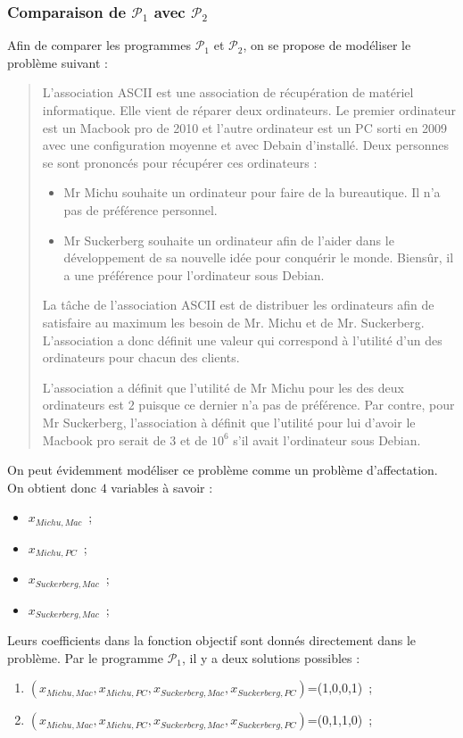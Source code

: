 \documentclass[a4paper, titlepage, oneside, 12pt]{article}%
\begin{document}
\subsubsection{Comparaison de $\mathcal{P}_1$ avec $\mathcal{P}_2$}

Afin de comparer les programmes $\mathcal{P}_1$ et $\mathcal{P}_2$, on se propose de modéliser le problème suivant :
\begin{quote}
L'association ASCII est une association de récupération de matériel informatique. Elle vient de réparer deux ordinateurs. Le premier ordinateur est un Macbook pro de 2010 et l'autre ordinateur est un PC sorti en 2009 avec une configuration moyenne et avec Debain d'installé. Deux personnes se sont prononcés pour récupérer ces ordinateurs :
\begin{itemize}
\item Mr Michu souhaite un ordinateur pour faire de la bureautique. Il n'a pas de préférence personnel.
\item Mr Suckerberg souhaite un ordinateur afin de l'aider dans le développement de sa nouvelle idée pour conquérir le monde. Biensûr, il a une préférence pour l'ordinateur sous Debian.
\end{itemize}

La tâche de l'association ASCII est de distribuer les ordinateurs afin de satisfaire au maximum les besoin de Mr. Michu et de Mr. Suckerberg. L'association a donc définit une valeur qui correspond à l'utilité d'un des ordinateurs pour chacun des clients.

L'association a définit que l'utilité de Mr Michu pour les des deux ordinateurs est $2$ puisque ce dernier n'a pas de préférence.
Par contre, pour Mr Suckerberg, l'association à définit que l'utilité pour lui d'avoir le Macbook pro serait de $3$ et de $10^6$ s'il avait l'ordinateur sous Debian. 
\end{quote}

On peut évidemment modéliser ce problème comme un problème d'affectation. On obtient donc $4$ variables à savoir :
\begin{itemize}
\item $x_{Michu, Mac}$~;
\item $x_{Michu, PC}$~;
\item $x_{Suckerberg, Mac}$~;
\item $x_{Suckerberg, Mac}$~;
\end{itemize}

Leurs coefficients dans la fonction objectif sont donnés directement dans le problème. Par le programme $\mathcal{P}_1$, il y a deux solutions possibles : 
\begin{enumerate}
\item $(x_{Michu, Mac},x_{Michu, PC},x_{Suckerberg, Mac},x_{Suckerberg, PC})$=(1,0,0,1)~;
\item $(x_{Michu, Mac},x_{Michu, PC},x_{Suckerberg, Mac},x_{Suckerberg, PC})$=(0,1,1,0)~;
\end{enumerate}
\end{document}
